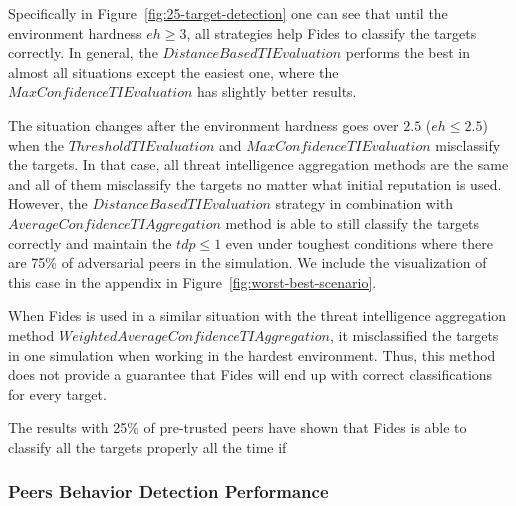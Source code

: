 Specifically in Figure~\ref{fig:25-target-detection} one can see that until the environment hardness $eh \geq 3$, all strategies help Fides to classify the targets correctly.
In general, the $DistanceBasedTIEvaluation$ performs the best in almost all situations except the easiest one, where the $MaxConfidenceTIEvaluation$ has slightly better results.

The situation changes after the environment hardness goes over $2.5$ ($eh \leq 2.5$) when the $ThresholdTIEvaluation$ and $MaxConfidenceTIEvaluation$ misclassify the targets. In that case, all threat intelligence aggregation methods are the same and all of them misclassify the targets no matter what initial reputation is used.
However, the $DistanceBasedTIEvaluation$ strategy in combination with $AverageConfidenceTIAggregation$ method is able to still classify the targets correctly and maintain the $tdp \leq 1$ even under toughest conditions where there are 75\% of adversarial peers in the simulation. 
We include the visualization of this case in the appendix in Figure~\ref{fig:worst-best-scenario}.

When Fides is used in a similar situation with the threat intelligence aggregation method $WeightedAverageConfidenceTIAggregation$, it misclassified the targets in one simulation when working in the hardest environment.
Thus, this method does not provide a guarantee that Fides will end up with correct classifications for every target.

The results with 25\% of pre-trusted peers have shown that Fides is able to classify all the targets properly all the time if 

\cleartoleftpage
\subsubsection{Peers Behavior Detection Performance}

